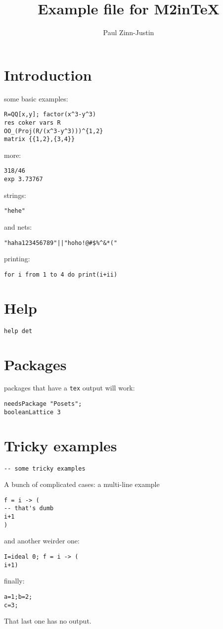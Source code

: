 \documentclass[12pt,a4paper]{amsart}
\title{Example file for M2inTeX}
\author{Paul Zinn-Justin}
\begin{document}
\maketitle

\section{Introduction}
some basic examples:
\begin{lstlisting}[language=Macaulay2]
R=QQ[x,y]; factor(x^3-y^3)
res coker vars R
OO_(Proj(R/(x^3-y^3)))^{1,2}
matrix {{1,2},{3,4}}
\end{lstlisting}
more:
\begin{lstlisting}[language=Macaulay2]
318/46
exp 3.73767
\end{lstlisting}
strings:
\begin{lstlisting}[language=Macaulay2]
"hehe"
\end{lstlisting}
and nets:
\begin{lstlisting}[language=Macaulay2]
"haha123456789"||"hoho!@#$%^&*("
\end{lstlisting}
printing:
\begin{lstlisting}[language=Macaulay2]
for i from 1 to 4 do print(i+ii)
\end{lstlisting}

\section{Help}
\begin{lstlisting}[language=Macaulay2]
help det
\end{lstlisting}

\section{Packages}
packages that have a {\tt tex} output will work:
\begin{lstlisting}[language=Macaulay2]
needsPackage "Posets";
booleanLattice 3
\end{lstlisting}

\section{Tricky examples}
\begin{lstlisting}[language=Macaulay2]
-- some tricky examples
\end{lstlisting}
A bunch of complicated cases: a multi-line example
\begin{lstlisting}[language=Macaulay2]
f = i -> (
-- that's dumb
i+1
)
\end{lstlisting}
and another weirder one:
\begin{lstlisting}[language=Macaulay2]
I=ideal 0; f = i -> (
i+1)
\end{lstlisting}
finally:
\begin{lstlisting}[language=Macaulay2]
a=1;b=2;
c=3;
\end{lstlisting}
That last one has no output.
\end{document}

